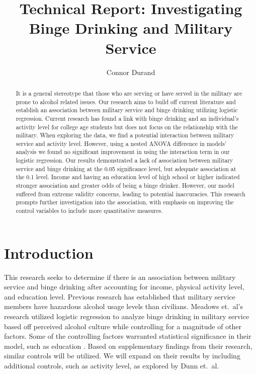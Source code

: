 \documentclass[12pt]{article}
\title{Technical Report: Investigating Binge Drinking and Military Service}
\author{Connor Durand}
\date{}
\begin{document}
\maketitle

\begin{abstract}
It is a general stereotype that those who are serving or have served in the military are prone to alcohol related issues. Our research aims to build off current literature and establish an association between military service and binge drinking utilizing logistic regression. Current research has found a link with binge drinking and an individual's activity level for college age students but does not focus on the relationship with the military. When exploring the data, we find a potential interaction between military service and activity level. However, using a nested ANOVA difference in models' analysis we found no significant improvement in using the interaction term in our logistic regression. Our results demonstrated a lack of association between military service and binge drinking at the 0.05 significance level, but adequate association at the 0.1 level. Income and having an education level of high school or higher indicated stronger association and greater odds of being a binge drinker. However, our model suffered from extreme validity concerns, leading to potential inaccuracies. This research prompts further investigation into the association, with emphasis on improving the control variables to include more quantitative measures.
\end{abstract}

\newpage

\section{Introduction}

This research seeks to determine if there is an association between military service and binge drinking after accounting for income, physical activity level, and education level. Previous research has established that military service members have hazardous alcohol usage levels than civilians. Meadows et.\ al's research utilized logistic regression to analyze binge drinking in military service based off perceived alcohol culture while controlling for a magnitude of other factors. Some of the controlling factors warranted statistical significance in their model, such as education \citep{meadows2023culture}. Based on supplementary findings from their research, similar controls will be utilized. We will expand on their results by including additional controls, such as activity level, as explored by Dunn et.\ al.
\end{document}
